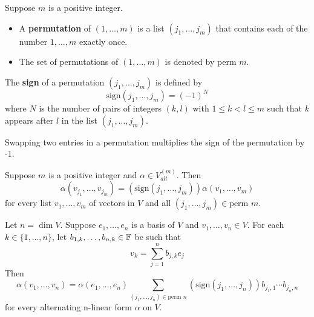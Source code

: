\documentclass{extarticle}
\begin{document}
\begin{definition}
    Suppose \(m\) is a positive integer. 
    \begin{itemize}
        \item A \textbf{permutation} of \((1, \ldots, m)\) is a list \((j_1, \ldots, j_m)\) that contains 
        each of the number \(1, \ldots, m\) exactly once. 
        \item The set of permutations of \((1, \ldots, m)\) is denoted by perm \(m\). 
    \end{itemize}
\end{definition}



\begin{definition}
    The \textbf{sign} of a permutation \((j_1, \ldots, j_m)\) is defined by 
    \[\text{sign}(j_1, \ldots, j_m) = (-1)^N\]
    where \(N\) is the number of pairs of integers \((k, l)\) with \(1 \leq k < l \leq m\) such that 
    \(k\) appears after \(l\) in the list \((j_1, \ldots, j_m)\).
\end{definition}



\begin{lemma}
    Swapping two entries in a permutation multiplies the sign of the permutation by -1.
\end{lemma}


\begin{lemma}
    Suppose \(m\) is a positive integer and \(\alpha \in V_{alt}^{(m)}\). Then 
    \[\alpha(v_{j_1}, \ldots, v_{j_m}) = \left( \text{sign} \left( j_1, \ldots, j_m \right) \right) 
    \alpha \left( v_1, \ldots, v_m \right)\]
    for every list \(v_1, \ldots, v_m\) of vectors in \(V\) and all \((j_1, \ldots, j_m) \in \text{perm } m\).
\end{lemma}

\begin{thm}
    Let \(n = \dim V\). Suppose \(e_1, \ldots, e_n\) is a basis of \(V\) and \(v_1, \ldots, v_n \in V\). For 
    each \(k \in \{1, \ldots, n\}\), let \(b_{1, k}, \ldots, b_{n, k} \in \mathbb{F}\) be such that 
    \[v_k = \sum_{j=1}^{n} b_{j, k} e_j\]
    Then 
    \[\alpha(v_1, \ldots, v_n) = \alpha(e_1, \ldots, e_n) \sum_{(j_1, \ldots, j_n) \in \text{perm } n} 
    \left( \text{sign} \left( j_1, \ldots, j_n \right) \right) b_{j_1 , 1} \cdots b_{j_n, n}\]
    for every alternating n-linear form \(\alpha\) on \(V\).
\end{thm}
\end{document}
